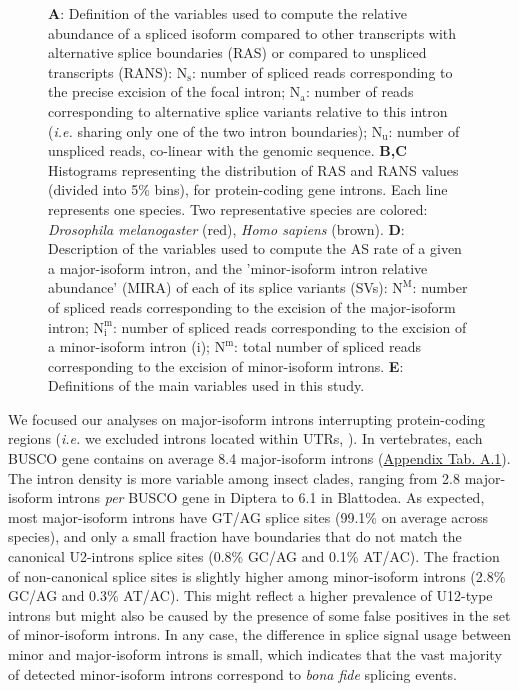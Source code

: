 \begin{figure}[htp]
{  \textbf{A}: Definition of the variables used to compute the relative abundance of a spliced isoform compared to other transcripts with alternative splice boundaries (RAS) or compared to unspliced transcripts (RANS): $\mathrm{N_s}$: number of spliced reads corresponding to the precise excision of the focal intron; $\mathrm{N_a}$: number of reads corresponding to alternative splice variants relative to this intron (\textit{i.e.} sharing only one of the two intron boundaries); $\mathrm{N_u}$: number of unspliced reads, co-linear with the genomic sequence. \textbf{B,C} Histograms representing the distribution of RAS and RANS values (divided into 5\% bins), for protein-coding gene introns. Each line represents one species. Two representative species are colored: \textit{Drosophila melanogaster} (red), \textit{Homo sapiens} (brown). \textbf{D}: Description of the variables used to compute the AS rate of a given a major-isoform intron, and the 'minor-isoform intron relative abundance' (MIRA) of each of its splice variants (\acrshort{SV}s): $\mathrm{N^M}$: number of spliced reads corresponding to the excision of the major-isoform intron; $\mathrm{N_i^m}$: number of spliced reads corresponding to the excision of a minor-isoform intron (i); $\mathrm{N^m}$: total number of spliced reads corresponding to the excision of minor-isoform introns. \textbf{E}: Definitions of the main variables used in this study.\newline}
    \label{fig:AS2}
\end{figure}


We focused our analyses on major-isoform introns interrupting protein-coding regions (\textit{i.e.} we excluded introns located within UTRs, ). In vertebrates, each \acrshort{BUSCO} gene contains on average 8.4 major-isoform introns (\hyperref[table:1]{Appendix Tab. A.1}). The intron density is more variable among insect clades, ranging from 2.8 major-isoform introns \textit{per} \acrshort{BUSCO} gene in Diptera to 6.1 in Blattodea. As expected, most major-isoform introns have GT/AG splice sites (99.1\% on average across species), and only a small fraction have boundaries that do not match the canonical U2-introns splice sites (0.8\% GC/AG and 0.1\% AT/AC). The fraction of non-canonical splice sites is slightly higher among minor-isoform introns (2.8\% GC/AG and 0.3\% AT/AC). This might reflect a higher prevalence of U12-type introns but might also be caused by the presence of some false positives in the set of minor-isoform introns. In any case, the difference in splice signal usage between minor and major-isoform introns is small, which indicates that the vast majority of detected minor-isoform introns correspond to \textit{bona fide} splicing events.


